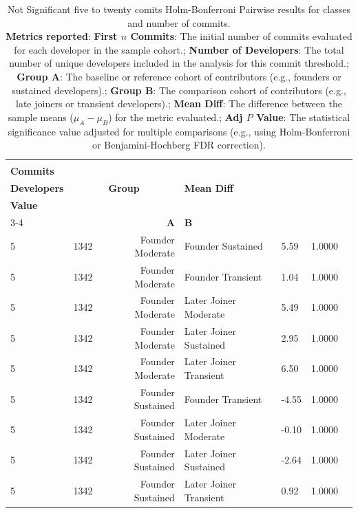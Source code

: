 \begin{table}[H]
\centering
\setlength{\tabcolsep}{2pt}
\caption[Not Significant Holm-Bonferroni Pairwise five and ten commits results classes]{Not Significant five to twenty comits Holm-Bonferroni Pairwise results for classes and number of commits. \\ \textbf{Metrics reported}:   \textbf{First $n$ Commits}: The initial number of commits evaluated for each developer in the sample cohort.;  \textbf{Number of Developers}: The total number of unique developers included in the analysis for this commit threshold.;  \textbf{Group A}: The baseline or reference cohort of contributors (e.g., founders or sustained developers).;  \textbf{Group B}: The comparison cohort of contributors (e.g., late joiners or transient developers).;  \textbf{Mean Diff}: The difference between the sample means ($\mu_A - \mu_B$) for the metric evaluated.;  \textbf{Adj $P$ Value}: The statistical significance value adjusted for multiple comparisons (e.g., using Holm-Bonferroni or Benjamini-Hochberg FDR correction).
}
\begin{tabular}{l r r l l r r}
\toprule
\makecell[t]{\textbf{First $n$}\\\textbf{Commits}} & \makecell[t]{\textbf{Number of}\\\textbf{Developers}} & \multicolumn{2}{c}{\textbf{Group}} & \textbf{Mean Diff} & \makecell[t]{\textbf{Adj $P$}\\\textbf{Value}} \\ 
\cmidrule(lr){3-4}
 &  & \textbf{A} & \textbf{B} &  &  \\ 
\midrule
5 & 1342 & Founder Moderate & Founder Sustained & 5.59 & 1.0000 \\ 
5 & 1342 & Founder Moderate & Founder Transient & 1.04 & 1.0000 \\ 
5 & 1342 & Founder Moderate & Later Joiner Moderate & 5.49 & 1.0000 \\ 
5 & 1342 & Founder Moderate & Later Joiner Sustained & 2.95 & 1.0000 \\ 
5 & 1342 & Founder Moderate & Later Joiner Transient & 6.50 & 1.0000 \\ 
5 & 1342 & Founder Sustained & Founder Transient & -4.55 & 1.0000 \\ 
5 & 1342 & Founder Sustained & Later Joiner Moderate & -0.10 & 1.0000 \\ 
5 & 1342 & Founder Sustained & Later Joiner Sustained & -2.64 & 1.0000 \\ 
5 & 1342 & Founder Sustained & Later Joiner Transient & 0.92 & 1.0000 \\ 

\end{tabular}
\end{table}
